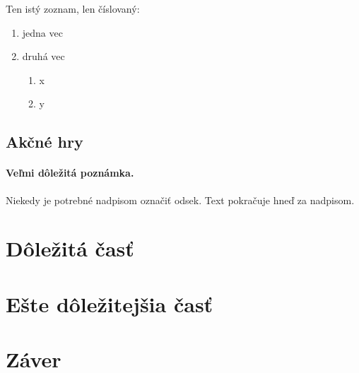 \documentclass[10pt,twoside,slovak,a4paper]{coursepaper}
\begin{document}
Ten istý zoznam, len číslovaný:

\begin{enumerate}
\item jedna vec
\item druhá vec
	\begin{enumerate}
	\item x
	\item y
	\end{enumerate}
\end{enumerate}


\subsection{Akčné hry} \label{zanre:akcne}


\paragraph{Veľmi dôležitá poznámka.}
Niekedy je potrebné nadpisom označiť odsek. Text pokračuje hneď za nadpisom.



\section{Dôležitá časť} \label{dolezita}




\section{Ešte dôležitejšia časť} \label{dolezitejsia}




\section{Záver} \label{zaver} %


%






\end{document}
